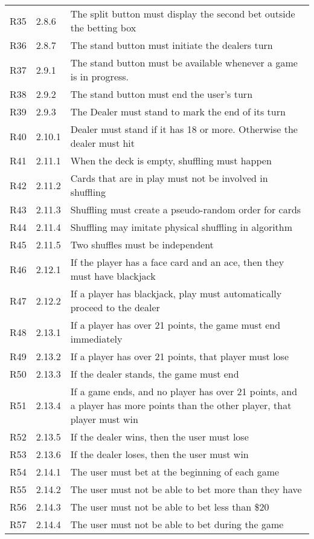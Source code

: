 \documentclass [landscape, 8pt] {article}
\begin{document}
\begin {table}[]
\begin {tabular}{p{4cm}p{3cm}p{15cm}}
			R35 & 2.8.6 & The split button must display the second bet outside the betting box\\
			R36 & 2.8.7 & The stand button must initiate the dealers turn\\
			R37 & 2.9.1 & The stand button must be available whenever a game is in progress.\\
			R38 & 2.9.2 & The stand button must end the user's turn\\
			R39 & 2.9.3 & The Dealer must stand to mark the end of its turn\\
			R40 & 2.10.1 & Dealer must stand if it has 18 or more. Otherwise the dealer must hit\\
			R41 & 2.11.1 & When the deck is empty, shuffling must happen\\
			R42 & 2.11.2 & Cards that are in play must not be involved in shuffling\\
			R43 & 2.11.3 & Shuffling must create a pseudo-random order for cards\\
			R44 & 2.11.4 & Shuffling may imitate physical shuffling in algorithm\\
			R45 & 2.11.5 & Two shuffles must be independent\\
			R46 & 2.12.1 & If the player has a face card and an ace, then they must have blackjack\\
			R47 & 2.12.2 & If a player has blackjack, play must automatically proceed to the dealer\\
			R48 & 2.13.1 & If a player has over 21 points, the game must end immediately\\
			R49 & 2.13.2 & If a player has over 21 points, that player must lose\\
			R50 & 2.13.3 & If the dealer stands, the game must end\\
			R51 & 2.13.4 & If a game ends, and no player has over 21 points, and a player has more points than the other player, that player must win\\
			R52 & 2.13.5 & If the dealer wins, then the user must lose\\
			R53 & 2.13.6 & If the dealer loses, then the user must win\\
			R54 & 2.14.1 & The user must bet at the beginning of each game\\
			R55 & 2.14.2 & The user must not be able to bet more than they have\\
			R56 & 2.14.3 & The user must not be able to bet less than \$20\\
			R57 & 2.14.4 & The user must not be able to bet during the game\\

\end{tabular}
\end{table}
\end{document}
